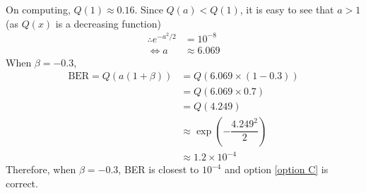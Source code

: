 \documentclass[journal,10pt,twocolumn]{IEEEtran}
\begin{document}
On computing, $Q(1) \approx 0.16$. Since $Q(a)<Q(1)$, it is easy to see that $a>1$ (as $Q(x)$ is a decreasing function)
\begin{align}
\therefore e^{-a^2 / 2} &= 10^{-8}\\
\Leftrightarrow a &\approx 6.069
\end{align}
When $\beta = -0.3$,
\begin{align}
\text{BER} = Q(a(1+\beta)) &= Q(6.069 \times (1-0.3))\\
&= Q(6.069 \times 0.7)\\
&= Q(4.249)\\
&\approx \exp (-\dfrac{4.249^2}{2})\\
&\approx 1.2 \times 10^{-4}
\end{align}
Therefore, when $\beta = -0.3$, BER is closest to $10^{-4}$ and option \ref{option C} is correct.
\end{document}
